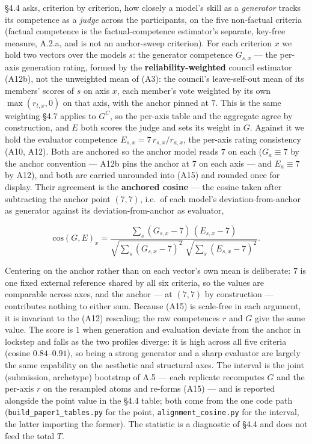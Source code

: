 §4.4 asks, criterion by criterion, how closely a model's skill as a \emph{generator} tracks its competence as a \emph{judge} across the participants, on the five non-factual criteria (factual competence is the factual-competence estimator's separate, key-free measure, A.2.a, and is not an anchor-sweep criterion). For each criterion \(x\) we hold two vectors over the models \(s\): the generator competence \(G_{s,x}\) --- the per-axis generation rating, formed by the \textbf{reliability-weighted} council estimator (A12b), not the unweighted mean of (A3): the council's leave-self-out mean of its members' scores of \(s\) on axis \(x\), each member's vote weighted by its own \(\max(r_{t,x},0)\) on that axis, with the anchor pinned at \(7\). This is the same weighting §4.7 applies to \(G^{C}\), so the per-axis table and the aggregate agree by construction, and \(E\) both scores the judge and sets its weight in \(G\). Against it we hold the evaluator competence \(E_{s,x}=7\,r_{s,x}/r_{a,x}\), the per-axis rating consistency (A10, A12). Both are anchored so the anchor model reads \(7\) on each (\(G_a\equiv7\) by the anchor convention --- A12b pins the anchor at \(7\) on each axis --- and \(E_a\equiv7\) by A12), and both are carried unrounded into (A15) and rounded once for display. Their agreement is the \textbf{anchored cosine} --- the cosine taken after subtracting the anchor point \((7,7)\), i.e.~of each model's deviation-from-anchor as generator against its deviation-from-anchor as evaluator,

\[ \mathrm{cos}(G,E)_x=\frac{\sum_{s}(G_{s,x}-7)\,(E_{s,x}-7)}{\sqrt{\sum_{s}(G_{s,x}-7)^2}\;\sqrt{\sum_{s}(E_{s,x}-7)^2}}. \tag{A15} \]

Centering on the anchor rather than on each vector's own mean is deliberate: \(7\) is one fixed external reference shared by all six criteria, so the values are comparable across axes, and the anchor --- at \((7,7)\) by construction --- contributes nothing to either sum. Because (A15) is scale-free in each argument, it is invariant to the (A12) rescaling; the raw competences \(r\) and \(G\) give the same value. The score is \(1\) when generation and evaluation deviate from the anchor in lockstep and falls as the two profiles diverge: it is high across all five criteria (cosine \(0.84\)--\(0.91\)), so being a strong generator and a sharp evaluator are largely the same capability on the aesthetic and structural axes. The interval is the joint (submission, archetype) bootstrap of A.5 --- each replicate recomputes \(G\) and the per-axis \(r\) on the resampled atoms and re-forms (A15) --- and is reported alongside the point value in the §4.4 table; both come from the one code path (\texttt{build\_paper1\_tables.py} for the point, \texttt{alignment\_cosine.py} for the interval, the latter importing the former). The statistic is a diagnostic of §4.4 and does not feed the total \(T\).

